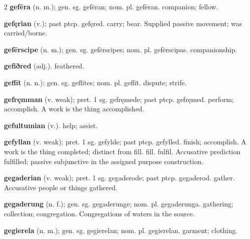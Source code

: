 \begin{multicols*}{2}
\textbf{gefēra} (n. m.); gen. sg. gefēran; nom. pl. gefēran. companion; fellow.\par
\textbf{gefęrian} (v.); past ptcp. gefęred. carry; bear. Supplied passive movement; was carried/borne.\par
\textbf{gefērscipe} (n. m.); gen. sg. gefērscipes; nom. pl. gefērscipas. companionship.\par
\textbf{gefiðred} (adj.). feathered.\par
\textbf{geflīt} (n. n.); gen. sg. geflītes; nom. pl. geflīt. dispute; strife.\par
\textbf{gefręmman} (v. weak); pret. 1 sg. gefręmede; past ptcp. gefręmed. perform; accomplish. A work is the thing accomplished.\par
\textbf{gefultumian} (v.). help; assist.\par
\textbf{gefyllan} (v. weak); pret. 1 sg. gefylde; past ptcp. gefylled. finish; accomplish. A work is the thing completed; distinct from fill. fill. fulfil. Accusative prediction fulfilled; passive subjunctive in the assigned purpose construction.\par
\textbf{gegaderian} (v. weak); pret. 1 sg. gegaderode; past ptcp. gegaderod. gather. Accusative people or things gathered.\par
\textbf{gegaderung} (n. f.); gen. sg. gegaderunge; nom. pl. gegaderunga. gathering; collection; congregation. Congregations of waters in the source.\par
\textbf{gegierela} (n. m.); gen. sg. gegierelan; nom. pl. gegierelan. garment; clothing.\par

\end{multicols*}
